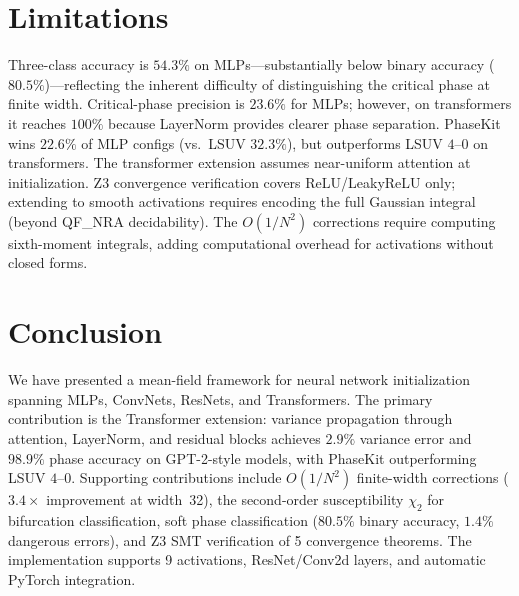 \documentclass[10pt]{article}
\begin{document}
\section{Limitations}
\label{sec:limitations}

Three-class accuracy is $54.3\%$ on MLPs---substantially below binary accuracy ($80.5\%$)---reflecting the inherent difficulty of distinguishing the critical phase at finite width.
Critical-phase precision is $23.6\%$ for MLPs; however, on transformers it reaches $100\%$ because LayerNorm provides clearer phase separation.
PhaseKit wins $22.6\%$ of MLP configs (vs.\ LSUV $32.3\%$), but outperforms LSUV $4$--$0$ on transformers.
The transformer extension assumes near-uniform attention at initialization.
Z3 convergence verification covers ReLU/LeakyReLU only; extending to smooth activations requires encoding the full Gaussian integral (beyond QF\_NRA decidability).
The $O(1/N^2)$ corrections require computing sixth-moment integrals, adding computational overhead for activations without closed forms.

\section{Conclusion}
\label{sec:conclusion}

We have presented a mean-field framework for neural network initialization spanning MLPs, ConvNets, ResNets, and Transformers.
The primary contribution is the Transformer extension: variance propagation through attention, LayerNorm, and residual blocks achieves $2.9\%$ variance error and $98.9\%$ phase accuracy on GPT-2-style models, with PhaseKit outperforming LSUV $4$--$0$.
Supporting contributions include $O(1/N^2)$ finite-width corrections ($3.4\times$ improvement at width~32), the second-order susceptibility $\chi_2$ for bifurcation classification, soft phase classification ($80.5\%$ binary accuracy, $1.4\%$ dangerous errors), and Z3 SMT verification of 5 convergence theorems.
The implementation supports 9 activations, ResNet/Conv2d layers, and automatic PyTorch integration.


\end{document}
